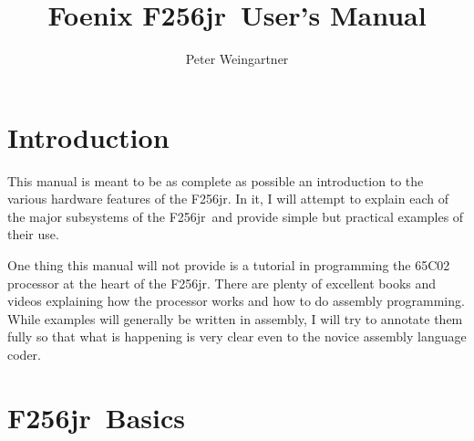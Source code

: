 \documentclass[oneside]{book}
\newcommand{\jr}{F256jr}
\begin{document}
\title{Foenix \jr\ User's Manual}
\author{Peter Weingartner}
\maketitle

\tableofcontents
\listoftables

\chapter{Introduction}

This manual is meant to be as complete as possible an introduction to the various hardware features of the \jr. In it, I will attempt to explain each of the major subsystems of the \jr\ and provide simple but practical examples of their use.

One thing this manual will not provide is a tutorial in programming the 65C02 processor at the heart of the \jr. There are plenty of excellent books and videos explaining how the processor works and how to do assembly programming. While examples will generally be written in assembly, I will try to annotate them fully so that what is happening is very clear even to the novice assembly language coder.

\chapter{\jr\ Basics}











\end{document}
